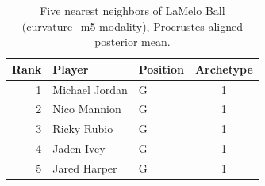 \begin{table}[htbp]
  \centering\small
  \begin{tabular}{rllc}
    \toprule
    Rank & Player & Position & Archetype \\
    \midrule
    1 & Michael Jordan & G & 1 \\
    2 & Nico Mannion & G & 1 \\
    3 & Ricky Rubio & G & 1 \\
    4 & Jaden Ivey & G & 1 \\
    5 & Jared Harper & G & 1 \\
    \bottomrule
  \end{tabular}
  \caption{Five nearest neighbors of LaMelo Ball (curvature_m5 modality), Procrustes-aligned posterior mean.}
  \label{tab:LaMelo_Ball_neighbors_curvature_m5}
\end{table}

